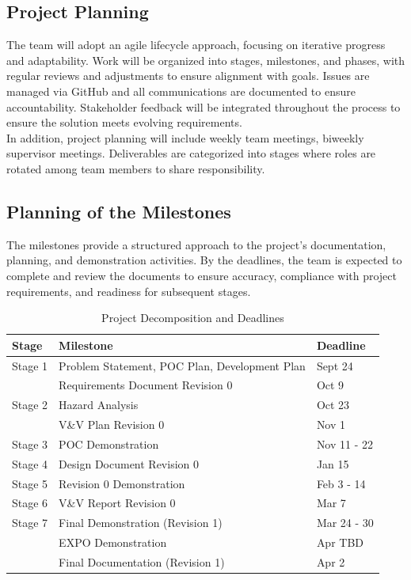 \documentclass[12pt]{article}
\begin{document}
\subsection{Project Planning}

The team will adopt an agile lifecycle approach, focusing on iterative progress
and adaptability. Work will be organized into stages, milestones, and phases,
with regular reviews and adjustments to ensure alignment with goals. Issues are
managed via GitHub and all communications are documented to ensure
accountability. Stakeholder feedback will be integrated throughout the process
to ensure the solution meets evolving requirements.\\
\newline
In addition, project planning will include weekly team meetings, biweekly
supervisor meetings. Deliverables are categorized into stages where roles are
rotated among team members to share responsibility.

\subsection{Planning of the Milestones}

The milestones provide a structured approach to the project's documentation,
planning, and demonstration activities. By the deadlines, the team is expected
to complete and review the documents to ensure accuracy, compliance with project
requirements, and readiness for subsequent stages.

\begin{table}[htbp]
  \centering
  \begin{tabular}{|l|l|l|}
  \hline
  \textbf{Stage} & \textbf{Milestone} & \textbf{Deadline} \\
  \hline
  Stage 1 & Problem Statement, POC Plan, Development Plan & Sept 24 \\
  \texttt{} & Requirements Document Revision 0 & Oct 9 \\
  \hline
  Stage 2 & Hazard Analysis & Oct 23 \\
  \texttt{} & V\&V Plan Revision 0 & Nov 1 \\
  \hline
  Stage 3 & POC Demonstration & Nov 11 - 22 \\
  \hline
  Stage 4 & Design Document Revision 0 & Jan 15 \\
  \hline
  Stage 5 & Revision 0 Demonstration & Feb 3 - 14\\
  \hline
  Stage 6 & V\&V Report Revision 0 & Mar 7 \\
  \hline
  Stage 7 & Final Demonstration (Revision 1) & Mar 24 - 30\\
  \texttt{} & EXPO Demonstration & Apr TBD \\
  \texttt{} & Final Documentation (Revision 1) & Apr 2 \\
  \hline
  \end{tabular}
  \caption{Project Decomposition and Deadlines}
  \label{table:2}
\end{table}
\end{document}

